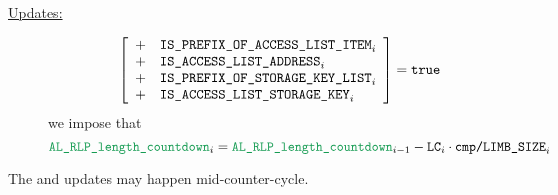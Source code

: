 \begin{description}
	\item[\underline{Updates:}]
		\If 
		\[
			\left[ \begin{array}{cl}
				+ & \texttt{IS\_PREFIX\_OF\_ACCESS\_LIST\_ITEM} _{i} \\
				+ & \texttt{IS\_ACCESS\_LIST\_ADDRESS}      _{i} \\
				+ & \texttt{IS\_PREFIX\_OF\_STORAGE\_KEY\_LIST} _{i} \\
				+ & \texttt{IS\_ACCESS\_LIST\_STORAGE\_KEY}   _{i} \\
			\end{array} \right]
			= \texttt{true}
		\]
		\Then
		we impose that
		\[
			\locAccessListLengthCountdown _{i} = \locAccessListLengthCountdown _{i - 1} - \lc _{i} \cdot \rlpTxnComputationColumnLimbSize _{i}
		\]
\end{description}
\saNote{} \label{rlp txn v2: phase constraints: access list: countdowns: non counter constancy of access list RLP length}
The \locAccessListLengthCountdown{}
and \locAccessListItemRlpLengthCountdown{}
updates may happen mid-counter-cycle.
